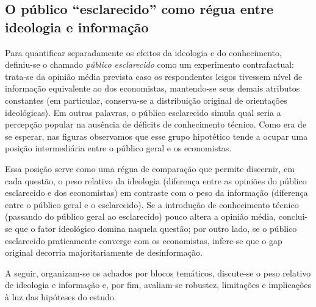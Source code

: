 \subsection{O público “esclarecido” como régua entre ideologia e informação} 

Para quantificar separadamente os efeitos da ideologia e do conhecimento, definiu-se o chamado \textit{público esclarecido} como um experimento contrafactual: trata-se da opinião média prevista caso os respondentes leigos tivessem nível de informação equivalente ao dos economistas, mantendo-se seus demais atributos constantes (em particular, conserva-se a distribuição original de orientações ideológicas). Em outras palavras, o público esclarecido simula qual seria a percepção popular na ausência de déficits de conhecimento técnico. Como era de se esperar, nas figuras observamos que esse grupo hipotético tende a ocupar uma posição intermediária entre o público geral e os economistas. 

Essa posição serve como uma régua de comparação que permite discernir, em cada questão, o peso relativo da ideologia (diferença entre as opiniões do público esclarecido e dos economistas) em contraste com o peso da informação (diferença entre o público geral e o esclarecido). Se a introdução de conhecimento técnico (passando do público geral ao esclarecido) pouco altera a opinião média, conclui-se que o fator ideológico domina naquela questão; por outro lado, se o público esclarecido praticamente converge com os economistas, infere-se que o gap original decorria majoritariamente de desinformação. 

A seguir, organizam-se os achados por blocos temáticos, discute-se o peso relativo de ideologia e informação e, por fim, avaliam-se robustez, limitações e implicações à luz das hipóteses do estudo.

